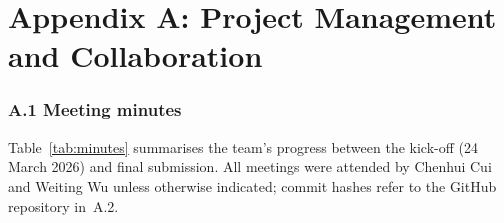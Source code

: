 \documentclass[11pt,a4paper]{article}
\begin{document}
\clearpage
\section*{Appendix A: Project Management and Collaboration}

\subsubsection*{A.1 Meeting minutes}

Table~\ref{tab:minutes} summarises the team's progress between the
kick-off (24 March 2026) and final submission. All meetings were
attended by Chenhui Cui and Weiting Wu unless otherwise indicated;
commit hashes refer to the GitHub repository in~A.2.
\end{document}
